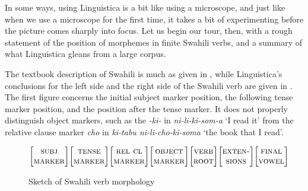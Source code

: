\documentclass[output=paper,colorlinks,citecolor=brown]{langscibook}
\begin{document}
In some ways, using Linguistica is a bit like using a microscope, and just like when we use a microscope for the first time, it takes a bit of experimenting before the picture comes sharply into focus. Let us begin our tour, then, with a rough statement of the position of morphemes in finite Swahili verbs, and a summary of what Linguistica gleans from a large corpus. 

The textbook description of Swahili is much as given in , while Linguistica's conclusions for the left side and the right side of the Swahili verb are given in . The first figure concerns the initial subject marker position, the following tense marker position, and the position after the tense marker. It does not properly distinguish object markers, such as the \textit{-ki-} in \textit{ni-li-ki-som-a} `I read it'  from the relative clause marker  \textit{cho} in \textit{ki-tabu ni-li-cho-ki-soma} `the book that I read'.     

  
\begin{figure} 
$\bigg[
\begin{tabular}{@{}c@{}} 
\textsc{subj}\\
\textsc{marker}\\
\end{tabular}
\bigg] 
\bigg[
\begin{tabular}{@{}c@{}} 
\textsc{tense}\\
\textsc{marker}\\
\end{tabular}
\bigg] 
\bigg[
\begin{tabular}{@{}c@{}} 
\textsc{rel cl}\\
\textsc{marker}\\
\end{tabular}
\bigg] 
\bigg[
\begin{tabular}{@{}c@{}} 
\textsc{object}\\
\textsc{marker}\\
\end{tabular}
\bigg] 
\bigg[
\begin{tabular}{@{}c@{}}
\textsc{verb}\\ 
\textsc{root}\\
\end{tabular}
\bigg] 
\bigg[
\begin{tabular}{@{}c@{}} 
\textsc{exten-}\\
\textsc{sions}
\end{tabular}
\bigg] 
\bigg[
\begin{tabular}{@{}c@{}} 
\textsc{final}\\
\textsc{vowel}
\end{tabular}
\bigg] 
$
\caption{Sketch of Swahili verb morphology}
\label{sketch}
\end{figure}
\end{document}
